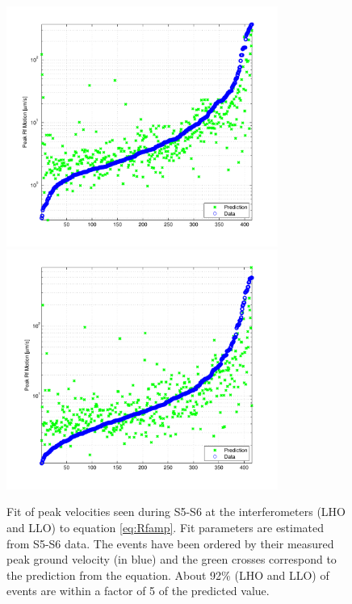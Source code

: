 \documentclass[reprint, prl, aps, showpacs]{revtex4-1}
\begin{document}
\begin{figure}[t]
\hspace*{-0.5cm}
 \includegraphics[width=3.5in]{Prediction_LHO_S5_S6.pdf}
 \includegraphics[width=3.5in]{Prediction_LLO_S5_S6.pdf}
 \caption{Fit of peak velocities seen during S5-S6 at the interferometers (LHO and LLO) to equation \ref{eq:Rfamp}.  Fit parameters are estimated from S5-S6 data. The events have been ordered by their measured peak ground velocity (in blue) and the green crosses correspond to the prediction from the equation. About 92\% (LHO and LLO) of events are within a factor of 5 of the predicted value.}
 \label{fig:regression}
\end{figure}
\end{document}
